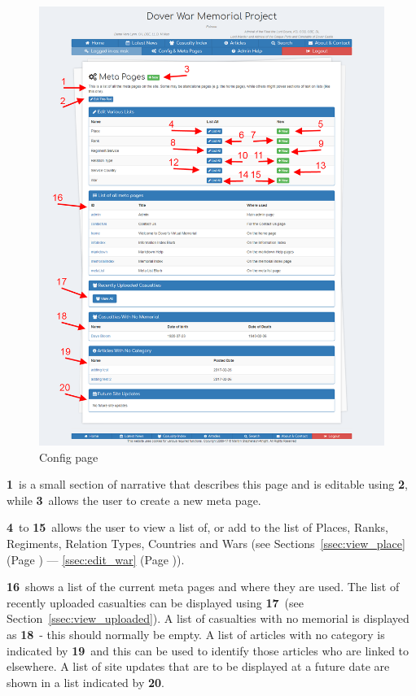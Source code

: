 \documentclass[12pt]{article}
\newcommand{\marker}[1]{\color{red}\textbf{#1}\color{black}}
\newcommand{\myref}[1]{\ref{#1} {\scriptsize(Page \pageref{#1})}}
\begin{document}
\begin{figure}[h]
  \centering
 \includegraphics[width=.9\textwidth]{pics/view_meta.png}
	\caption{Config page}\label{fig:view_meta}
\end{figure}

\marker{1}\ is a small section of narrative that describes this page and is editable using \marker{2}, while \marker{3}\ allows the user to create a new meta page.

\marker{4}\ to \marker{15}\ allows the user to view a list of, or add to the list of Places, Ranks, Regiments, Relation Types, Countries and Wars (see Sections~\myref{ssec:view_place} --- \myref{ssec:edit_war}).

\marker{16}\ shows a list of the current meta pages and where they are used. The list of recently uploaded casualties can be displayed using \marker{17}\ (see Section~\ref{ssec:view_uploaded}). A list of casualties with no memorial is displayed as \marker{18}\ - this should normally be empty. A list of articles with no category is indicated by \marker{19}\ and this can be used to identify those articles who are linked to elsewhere. A list of site updates that are to be displayed at a future date are shown in a list indicated by \marker{20}.
\end{document}

